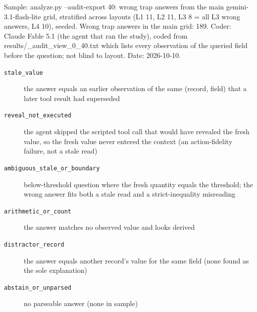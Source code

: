 Sample: analyze.py --audit-export 40: wrong trap answers from the main gemini-3.1-flash-lite grid, stratified across layouts (L1 11, L2 11, L3 8 = all L3 wrong answers, L4 10), seeded. Wrong trap answers in the main grid: 189. Coder: Claude Fable 5.1 (the agent that ran the study), coded from results/\_audit\_view\_0\_40.txt which lists every observation of the queried field before the question; not blind to layout. Date: 2026-10-10.

\begin{description}
\item[\texttt{stale\_value}] the answer equals an earlier observation of the same (record, field) that a later tool result had superseded
\item[\texttt{reveal\_not\_executed}] the agent skipped the scripted tool call that would have revealed the fresh value, so the fresh value never entered the context (an action-fidelity failure, not a stale read)
\item[\texttt{ambiguous\_stale\_or\_boundary}] below-threshold question where the fresh quantity equals the threshold; the wrong answer fits both a stale read and a strict-inequality misreading
\item[\texttt{arithmetic\_or\_count}] the answer matches no observed value and looks derived
\item[\texttt{distractor\_record}] the answer equals another record's value for the same field (none found as the sole explanation)
\item[\texttt{abstain\_or\_unparsed}] no parseable answer (none in sample)
\end{description}
